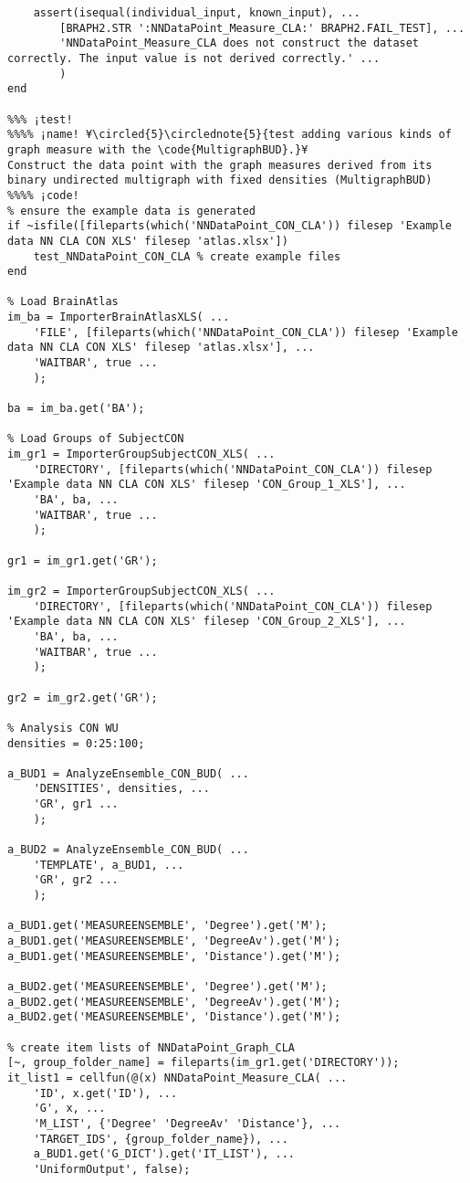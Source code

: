 \documentclass{tufte-handout}
\begin{document}
\begin{lstlisting}
    assert(isequal(individual_input, known_input), ...
        [BRAPH2.STR ':NNDataPoint_Measure_CLA:' BRAPH2.FAIL_TEST], ...
        'NNDataPoint_Measure_CLA does not construct the dataset correctly. The input value is not derived correctly.' ...
        )
end

%%% ¡test!
%%%% ¡name! ¥\circled{5}\circlednote{5}{test adding various kinds of graph measure with the \code{MultigraphBUD}.}¥
Construct the data point with the graph measures derived from its binary undirected multigraph with fixed densities (MultigraphBUD)
%%%% ¡code!
% ensure the example data is generated
if ~isfile([fileparts(which('NNDataPoint_CON_CLA')) filesep 'Example data NN CLA CON XLS' filesep 'atlas.xlsx'])
    test_NNDataPoint_CON_CLA % create example files
end

% Load BrainAtlas
im_ba = ImporterBrainAtlasXLS( ...
    'FILE', [fileparts(which('NNDataPoint_CON_CLA')) filesep 'Example data NN CLA CON XLS' filesep 'atlas.xlsx'], ...
    'WAITBAR', true ...
    );

ba = im_ba.get('BA');

% Load Groups of SubjectCON
im_gr1 = ImporterGroupSubjectCON_XLS( ...
    'DIRECTORY', [fileparts(which('NNDataPoint_CON_CLA')) filesep 'Example data NN CLA CON XLS' filesep 'CON_Group_1_XLS'], ...
    'BA', ba, ...
    'WAITBAR', true ...
    );

gr1 = im_gr1.get('GR');

im_gr2 = ImporterGroupSubjectCON_XLS( ...
    'DIRECTORY', [fileparts(which('NNDataPoint_CON_CLA')) filesep 'Example data NN CLA CON XLS' filesep 'CON_Group_2_XLS'], ...
    'BA', ba, ...
    'WAITBAR', true ...
    );

gr2 = im_gr2.get('GR');

% Analysis CON WU
densities = 0:25:100;

a_BUD1 = AnalyzeEnsemble_CON_BUD( ...
    'DENSITIES', densities, ...
    'GR', gr1 ...
    );

a_BUD2 = AnalyzeEnsemble_CON_BUD( ...
    'TEMPLATE', a_BUD1, ...
    'GR', gr2 ...
    );

a_BUD1.get('MEASUREENSEMBLE', 'Degree').get('M');
a_BUD1.get('MEASUREENSEMBLE', 'DegreeAv').get('M');
a_BUD1.get('MEASUREENSEMBLE', 'Distance').get('M');

a_BUD2.get('MEASUREENSEMBLE', 'Degree').get('M');
a_BUD2.get('MEASUREENSEMBLE', 'DegreeAv').get('M');
a_BUD2.get('MEASUREENSEMBLE', 'Distance').get('M');

% create item lists of NNDataPoint_Graph_CLA
[~, group_folder_name] = fileparts(im_gr1.get('DIRECTORY'));
it_list1 = cellfun(@(x) NNDataPoint_Measure_CLA( ...
    'ID', x.get('ID'), ...
    'G', x, ...
    'M_LIST', {'Degree' 'DegreeAv' 'Distance'}, ...
    'TARGET_IDS', {group_folder_name}), ...
    a_BUD1.get('G_DICT').get('IT_LIST'), ...
    'UniformOutput', false);


\end{lstlisting}
\end{document}
